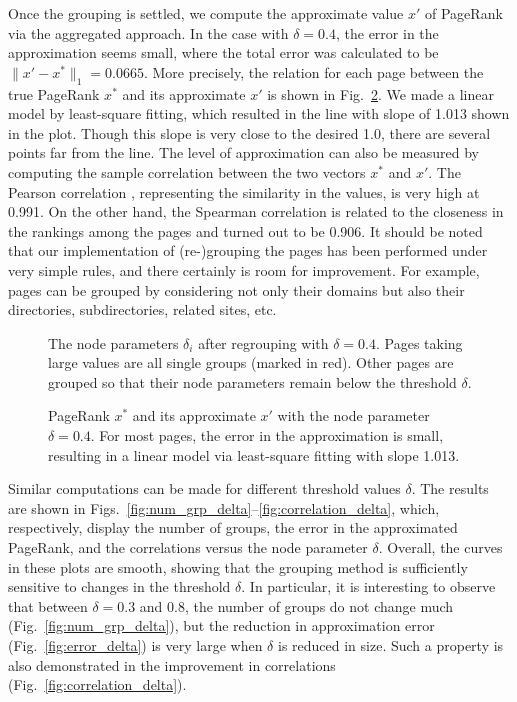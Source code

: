 \documentclass[11pt,draftcls,onecolumn]{IEEEtran}
\newcommand{\fig}[3]{\resizebox{#1}{#2}{\texttt{[image: \#3]}}}
\begin{document}
Once the grouping is settled, we compute the approximate value $x'$ of PageRank
via the aggregated approach. In the case with $\delta=0.4$, the error in the 
approximation seems small, where the total error was calculated to be
$\|x'-x^*\|_1=0.0665$.
More precisely, the relation for each page between the true PageRank $x^*$ and its
approximate $x'$ is shown in Fig.~\ref{fig:PR_orig_approx}. 
We made a linear model by least-square fitting, which 
resulted in the line with slope of 1.013 shown in the plot. 
Though this slope is very close to the desired 1.0, there are several points far from the line. 
The level of approximation can also be measured 
by computing the sample correlation between the two vectors $x^*$ and $x'$.
The Pearson correlation \cite{SneCoc:89}, representing the similarity in the values, is very high
at 0.991. On the other hand, the Spearman correlation
\cite{SneCoc:89} 
is related to the closeness
in the rankings among the pages and turned out to be 0.906. 
It should be noted that our implementation of (re-)grouping the pages has been performed 
under very simple rules, and there certainly is room for improvement. For example,
pages can be grouped by considering not only their domains but also 
their directories, subdirectories, related sites, etc. 



\begin{figure}[t]
  \centering
  \fig{9cm}{!}{delta_i_04.eps}
  \caption{The node parameters $\delta_i$ after regrouping with $\delta=0.4$.
     Pages taking large values are all single groups (marked in red). Other pages
     are grouped so that their node parameters remain below the threshold $\delta$.}
  \label{fig:delta_i_04}
\end{figure}

\begin{figure}[t]
  \centering
  \fig{9cm}{!}{PR_orig_approx.eps}
  \caption{PageRank $x^*$ and its approximate $x'$ with the node parameter $\delta=0.4$.
      For most pages, the error in the approximation is small, resulting in a linear model
      via least-square fitting with slope 1.013.}
  \label{fig:PR_orig_approx}
\end{figure}

Similar computations can be made for different threshold values $\delta$. The results
are shown in Figs.~\ref{fig:num_grp_delta}--\ref{fig:correlation_delta},
which, respectively, display the number of groups, the error in the approximated 
PageRank, and the correlations versus the node parameter $\delta$.
Overall, the curves in these plots are smooth, showing that the grouping
method is sufficiently sensitive to changes in the threshold $\delta$.
In particular, it is interesting to observe that between $\delta=0.3$ and $0.8$, the
number of groups do not change much (Fig.~\ref{fig:num_grp_delta}),
but the reduction in approximation error (Fig.~\ref{fig:error_delta})
is very large when $\delta$ is reduced in size. Such a property is also demonstrated 
in the improvement in correlations (Fig.~\ref{fig:correlation_delta}).
\end{document}
